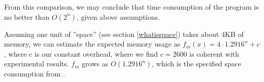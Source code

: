 \documentclass[a4paper]{article}
\begin{document}
From this comparison, we may conclude that time consumption of the program is no better than $O(2^n)$, given above assumptions.

\begin{center}
\end{center}

Assuming one unit of ''space'' (see section \ref{whatisspace}) takes about 4KB of memory, we can estimate the expected memory usage as $f_m(x) = 4\cdot1.2916^n + c$, where $c$ is our constant overhead, where we find $c = 2600$ is coherent with experimental results. $f_m$ grows as $O(1.2916^n)$, which is the specified space consumption from \cite{cov_pack}.

% 
% 
\end{document}

